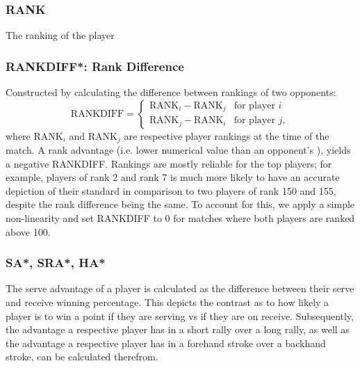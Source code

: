 \subsubsection*{RANK} \label{sec:rank}
The ranking of the player 

\subsubsection*{RANKDIFF*: Rank Difference} \label{sec:rankdiff}
Constructed by calculating the difference between rankings of two opponents:
\begin{equation}
    \text{RANKDIFF} = \begin{cases}
\text{RANK}_i - \text{RANK}_j &\text{for player $i$} \\
\text{RANK}_j - \text{RANK}_i &\text{for player $j$},
\end{cases}
\end{equation}
where RANK$_i$ and RANK$_j$ are respective player rankings at the time of the match. A rank advantage (i.e. lower numerical value than an opponent's ), yields a negative RANKDIFF. Rankings are mostly reliable for the top players; for example, players of rank 2 and rank 7 is much more likely to have an accurate depiction of their standard in comparison to two players of rank 150 and 155, despite the rank difference being the same. To account for this, we apply a simple non-linearity and set RANKDIFF to $0$ for matches where both players are ranked above 100.%


\subsubsection*{SA*, SRA*, HA*} \label{sec:advantage}
The serve advantage of a player is calculated as the difference between their serve and receive winning percentage. This depicts the contrast as to how likely a player is to win a point if they are serving vs if they are on receive. Subsequently, the advantage a respective player has in a short rally over a long rally, as well as the advantage a respective player has in a forehand stroke over a backhand stroke, can be calculated therefrom.

